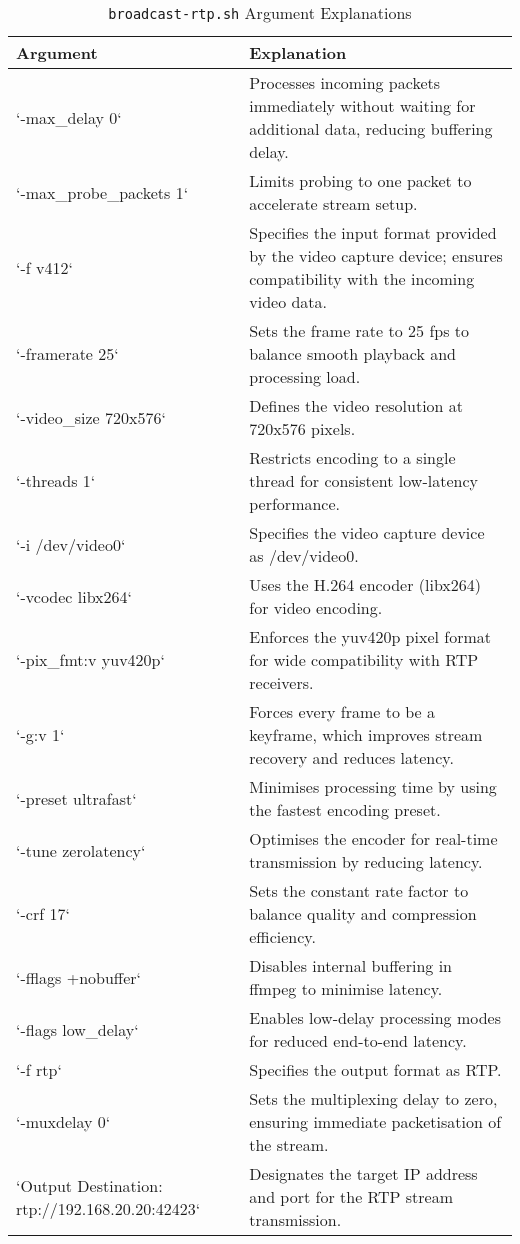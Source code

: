 \begin{table}[!ht]
    \centering
    \begin{tabular}{|p{5cm}|p{10cm}|}
    \hline
        Argument & Explanation \\ \hline
        `-max\_delay 0` & Processes incoming packets immediately without waiting for additional data, reducing buffering delay. \\ \hline
        `-max\_probe\_packets 1` & Limits probing to one packet to accelerate stream setup. \\ \hline
        `-f v412` & Specifies the input format provided by the video capture device; ensures compatibility with the incoming video data. \\ \hline
        `-framerate 25` & Sets the frame rate to 25 fps to balance smooth playback and processing load. \\ \hline
        `-video\_size 720x576` & Defines the video resolution at 720x576 pixels. \\ \hline
        `-threads 1` & Restricts encoding to a single thread for consistent low-latency performance. \\ \hline
        `-i /dev/video0` & Specifies the video capture device as /dev/video0. \\ \hline
        `-vcodec libx264` & Uses the H.264 encoder (libx264) for video encoding. \\ \hline
        `-pix\_fmt:v yuv420p` & Enforces the yuv420p pixel format for wide compatibility with RTP receivers. \\ \hline
        `-g:v 1` & Forces every frame to be a keyframe, which improves stream recovery and reduces latency. \\ \hline
        `-preset ultrafast` & Minimises processing time by using the fastest encoding preset. \\ \hline
        `-tune zerolatency` & Optimises the encoder for real-time transmission by reducing latency. \\ \hline
        `-crf 17` & Sets the constant rate factor to balance quality and compression efficiency. \\ \hline
        `-fflags +nobuffer` & Disables internal buffering in ffmpeg to minimise latency. \\ \hline
        `-flags low\_delay` & Enables low-delay processing modes for reduced end-to-end latency. \\ \hline
        `-f rtp` & Specifies the output format as RTP. \\ \hline
        `-muxdelay 0` & Sets the multiplexing delay to zero, ensuring immediate packetisation of the stream. \\ \hline
        `Output Destination: rtp://192.168.20.20:42423` & Designates the target IP address and port for the RTP stream transmission. \\ \hline
    \end{tabular}
\caption{\texttt{broadcast-rtp.sh} Argument Explanations}
    \label{tab:broadcast-args}

\end{table}




